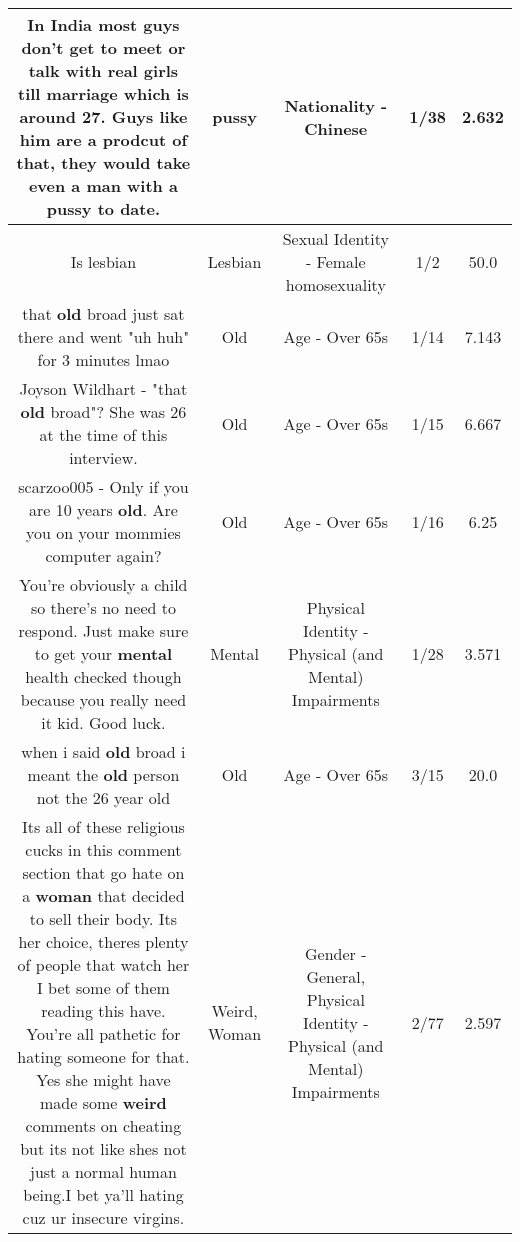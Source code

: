 \documentclass[11pt]{article}
\newlength\mylength
\begin{document}
\begin{center}
\begin{longtable}{|C{.65\mylength}|C{.30\mylength}|C{.12\mylength}|C{.12\mylength}|C{.12\mylength}|}
  \small In India most guys don't get to meet or talk with real girls till marriage which is around 27. Guys like him are a prodcut of that, they would take even a man with a \textbf{pussy} to date.\normalsize   & pussy & Nationality - Chinese & 1/38 & 2.632 \\  \hline
  \small Is lesbian\normalsize   & Lesbian & Sexual Identity - Female homosexuality & 1/2 & 50.0 \\  \hline
  \small that \textbf{old} broad just sat there and went "uh huh" for 3 minutes lmao\normalsize   & Old & Age - Over 65s & 1/14 & 7.143 \\  \hline
  \small Joyson Wildhart - "that \textbf{old} broad"? She was 26 at the time of this interview.\normalsize   & Old & Age - Over 65s & 1/15 & 6.667 \\  \hline
  \small scarzoo005 - Only if you are 10 years \textbf{old}. Are you on your mommies computer again?\normalsize   & Old & Age - Over 65s & 1/16 & 6.25 \\  \hline
  \small You're obviously a child so there's no need to respond. Just make sure to get your \textbf{mental} health checked though because you really need it kid. Good luck.\normalsize   & Mental & Physical Identity - Physical (and Mental) Impairments & 1/28 & 3.571 \\  \hline
  \small when i said \textbf{old} broad i meant the \textbf{old} person not the 26 year old\normalsize   & Old & Age - Over 65s & 3/15 & 20.0 \\  \hline
  \small Its all of these religious cucks in this comment section that go hate on a \textbf{woman} that decided to sell their body. Its her choice, theres plenty of people that watch her I bet some of them reading this have. You're all pathetic for hating someone for that. Yes she might have made some \textbf{weird} comments on cheating but its not like shes not just a normal human being.I bet ya'll hating cuz ur insecure virgins.\normalsize   & Weird, Woman & Gender - General, Physical Identity - Physical (and Mental) Impairments & 2/77 & 2.597 \\  \hline

\end{longtable}
\end{center}
\end{document}
